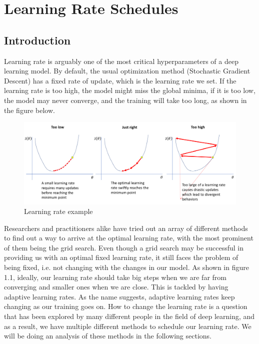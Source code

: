\section{Learning Rate Schedules}
\subsection{Introduction}
Learning rate is arguably one of the most critical hyperparameters of a deep learning model. By default, the usual optimization method (Stochastic Gradient Descent) has a fixed rate of update, which is the learning rate we set. If the learning rate is too high, the model might miss the global minima, if it is too low, the model may never converge, and the training will take too long, as shown in the figure below.
\begin{figure}[!ht]
    \centering
    \includegraphics[scale=0.3]{./imgs/2019A7PS0097P-01.png}
    \caption{Learning rate example}
    \label{fig:learning_rate_ex}
\end{figure}


Researchers and practitioners alike have tried out an array of different methods to find out a way to arrive at the optimal learning rate, with the most prominent of them being the grid search. Even though a grid search may be successful in providing us with an optimal fixed learning rate, it still faces the problem of being fixed, i.e. not changing with the changes in our model. As shown in figure 1.1, ideally, our learning rate should take big steps when we are far from converging and smaller ones when we are close. This is tackled by having adaptive learning rates. As the name suggests, adaptive learning rates keep changing as our training goes on. How to change the learning rate is a question that has been explored by many different people in the field of deep learning, and as a result, we have multiple different methods to schedule our learning rate. We will be doing an analysis of these methods in the following sections.

